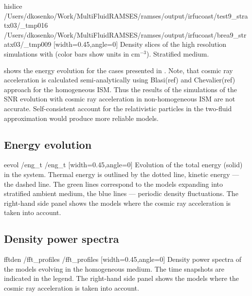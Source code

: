 \documentclass[referee,oldversion]{aa}
\def\basedir{/Users/dkosenko/Work/MultiFluidRAMSES/ramses/output}
\begin{document}
\def\thhom{\basedir/test6nfr0}
\def\thstra{\basedir/irfucoast/test9_stratx03}
\def\thturb{\basedir/test6nfr02}
\def\bhhom{\basedir/breact6nfr0}
\def\bhstra{\basedir/irfucoast/brea9_stratx03}
\def\bhturb{\basedir/breact6nfr02}
\def\slice{_tmp009}
\FIGG hislice   {\thstra/_tmp016}  {\bhstra/\slice}  [width=0.45\hsize,angle=0]  Density slices of the high resolution simulations with (color bars show units in cm$^{-3}$). Stratified medium.

 shows the energy evolution for the cases presented in . Note, that cosmic ray acceleration is calculated semi-analytically using Blasi(ref) and Chevalier(ref) approach for the homogeneous ISM. Thus the results of the simulations of the SNR evolution with cosmic ray acceleration in non-homogeneous ISM are not accurate. Self-consistent account for the relativistic particles in the two-fluid approximation would produce more reliable models.

\subsection{Energy evolution}
\def\evol{eng_t}
\FIGG eevol  {\thom/\evol}  {\bhom/\evol}  [width=0.45\hsize,angle=0]  Evolution of the total energy (solid) in the system. Thermal energy is outlined by the dotted line, kinetic energy --- the dashed line. The green lines correspond to the models expanding into stratified ambient medium, the blue lines --- periodic density fluctuations. The right-hand side panel shows the models where the cosmic ray acceleration is taken into account.


\subsection{Density power spectra}
\def\fftd{fft_profiles}
\FIGG fftden  {\thom/\fftd}  {\bhom/\fftd}  [width=0.45\hsize,angle=0]  Density power spectra of the models evolving in the homogeneous medium. The time snapshots are indicated in the legend. The right-hand side panel shows the models where the cosmic ray acceleration is taken into account.

 
\end{document}
